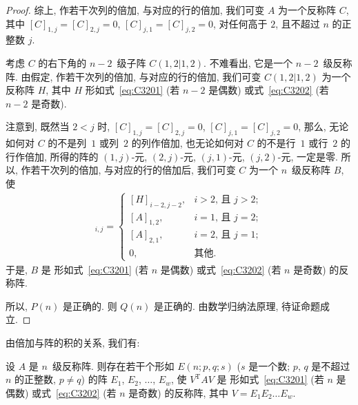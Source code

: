 \begin{proof}
    综上, 作若干次列的倍加, 与对应的行的倍加,
    我们可变 \(A\) 为一个反称阵 \(C\),
    其中
    \([C]_{1,j} = [C]_{2,j} = 0\),
    \([C]_{j,1} = [C]_{j,2} = 0\),
    对任何高于 \(2\), 且不超过 \(n\) 的正整数 \(j\).

    考虑 \(C\) 的右下角的 \(n-2\)~级子阵 \(C({1,2}|{1,2})\).
    不难看出, 它是一个 \(n-2\)~级反称阵.
    由假定,
    作若干次列的倍加, 与对应的行的倍加,
    我们可变 \(C({1,2}|{1,2})\) 为一个反称阵 \(H\),
    其中 \(H\) 形如式~\eqref{eq:C3201} (若 \(n-2\) 是偶数)
    或式~\eqref{eq:C3202} (若 \(n-2\) 是奇数).

    注意到, 既然当 \(2 < j\) 时,
    \([C]_{1,j} = [C]_{2,j} = 0\),
    \([C]_{j,1} = [C]_{j,2} = 0\),
    那么,
    无论如何对 \(C\) 的不是列~\(1\) 或列~\(2\) 的列作倍加,
    也无论如何对 \(C\) 的不是行~\(1\) 或行~\(2\) 的行作倍加,
    所得的阵的
    \((1, j)\)-元, \((2, j)\)-元, \((j, 1)\)-元, \((j, 2)\)-元,
    一定是零.
    所以, 作若干次列的倍加, 与对应的行的倍加后,
    我们可变 \(C\) 为一个 \(n\)~级反称阵 \(B\),
    使
    \begin{align*}
        [B]_{i,j}
        = \begin{cases}
              [H]_{i-2,j-2}, & \text{\(i > 2\), 且 \(j > 2\)}; \\
              [A]_{1,2},     & \text{\(i = 1\), 且 \(j = 2\)}; \\
              [A]_{2,1},     & \text{\(i = 2\), 且 \(j = 1\)}; \\
              0,             & \text{其他}.
          \end{cases}
    \end{align*}
    于是, \(B\) 是%
    形如式~\eqref{eq:C3201} (若 \(n\) 是偶数)
    或式~\eqref{eq:C3202} (若 \(n\) 是奇数)
    的反称阵.

    所以, \(P(n)\) 是正确的.
    则 \(Q(n)\) 是正确的.
    由数学归纳法原理, 待证命题成立.
\end{proof}

由倍加与阵的积的关系, 我们有:

\begin{theorem}
    设 \(A\) 是 \(n\)~级反称阵.
    则存在若干个形如 \(E(n; p, q; s)\)
    (\(s\) 是一个数;
    \(p\), \(q\) 是不超过 \(n\) 的正整数,
    \(p \neq q\))
    的阵
    \(E_1\), \(E_2\), \(\dots\), \(E_w\),
    使 \(V^{\mathrm{T}} AV\) 是%
    形如式~\eqref{eq:C3201} (若 \(n\) 是偶数)
    或式~\eqref{eq:C3202} (若 \(n\) 是奇数)
    的反称阵,
    其中 \(V = E_1 E_2 \dots E_w\).
\end{theorem}

